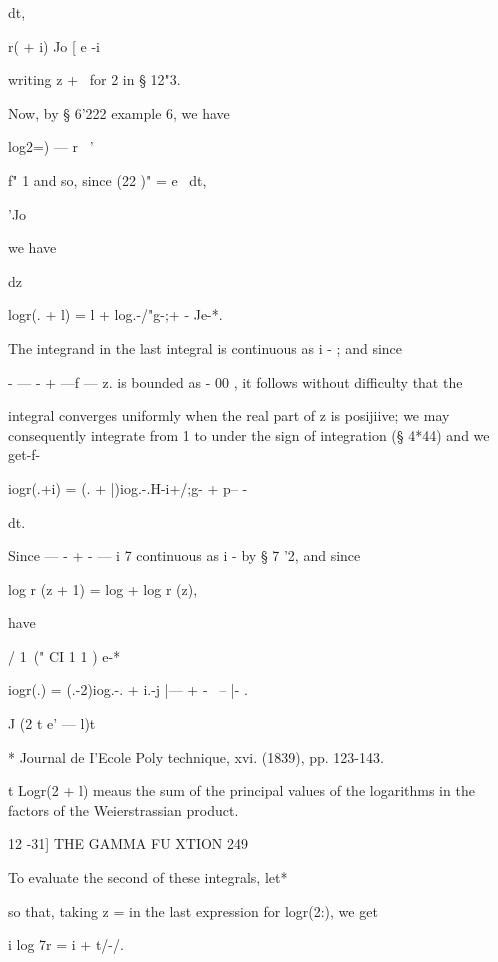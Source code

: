 dt,



r( + i) Jo [ e -i



writing z + \ for 2 in § 12"3.

Now, by § 6'222 example 6, we have



log2=) — r~ '



f" 1 and so, since (22 )" = e~ dt,

'Jo



we have

dz



logr(. + l) = l + log.-/"g-;+ - Je-*.



The integrand in the last integral is continuous as i - ; and since

- — - + —f — z. is bounded as - 00 , it follows without difficulty
that the

integral converges uniformly when the real part of z is posijiive; we
may consequently integrate from 1 to under the sign of integration (§
4*44) and we get-f-

iogr(.+i) = (. + |)iog.-.H-i+/;g- + p-- -



dt.



Since — - + - — i 7 continuous as i - by § 7 '2, and since

log r (z + 1) = log + log r (z),

have

/ 1\ (" CI 1 1 ) e-*

iogr(.) = (.-2)iog.-. + i.-j |--- + - \ -- |- .



J (2 t e' — l)t

* Journal de I'Ecole Poly technique, xvi. (1839), pp. 123-143.

t Logr(2 + l) meaus the sum of the principal values of the logarithms
in the factors of the Weierstrassian product.



12 -31] THE GAMMA FU XTION 249

To evaluate the second of these integrals, let*

so that, taking z = in the last expression for logr(2:), we get

i log 7r = i + t/-/.



